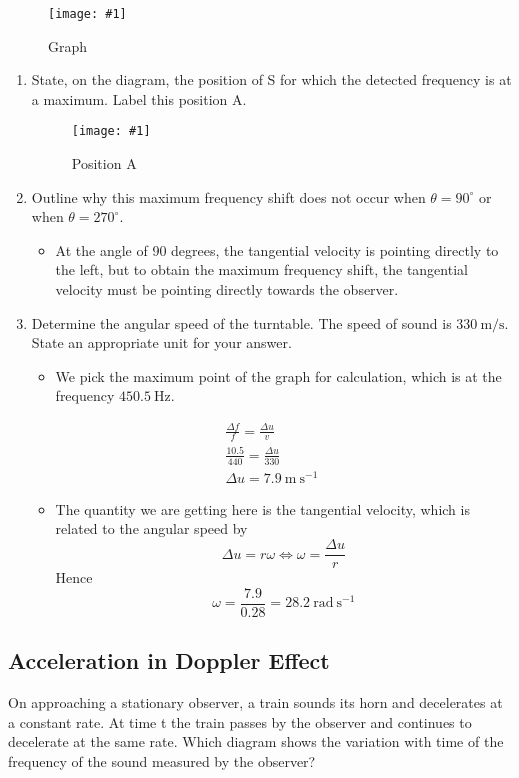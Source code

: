 \documentclass[a4paper,12pt]{article}
\newcommand{\degsym}{^{\circ}}
\newcommand{\img}[4]{\begin{center}
  \begin{figure}[H]
    \centering
    \texttt{[image: \#1]}
    \caption{#3}
    \label{fig:#4}
  \end{figure}
\end{center}}
\begin{document}
\img{ex/2.png}{0.9}{Graph}{2}

\begin{enumerate}[label=(\alph*)]
  \item State, on the diagram, the position of S for which the detected frequency is at a maximum. Label this position A.
        \img{ex/3.png}{0.9}{Position A}{3}
  \item Outline why this maximum frequency shift does not occur when $\theta= 90\degsym$ or when $\theta= 270\degsym$.
        \begin{itemize}
          \item At the angle of 90 degrees, the tangential velocity is pointing directly to the left, but to obtain the maximum frequency shift, the tangential velocity must be pointing directly towards the observer.
        \end{itemize}
  \item Determine the angular speed of the turntable. The speed of sound is $\SI{330}{\m\per\s}$. State an appropriate unit for your answer.
        \begin{itemize}
          \item We pick the maximum point of the graph for calculation, which is at the frequency $450.5 \mathrm{~Hz}$.
        \end{itemize}
        \begin{align*}
          \frac{\Delta f}{f} = \frac{\Delta u}{v} \\
          \frac{10.5}{440} = \frac{\Delta u}{330} \\
          \Delta u = 7.9 \mathrm{~m} \mathrm{~s}^{-1}
        \end{align*}
        \begin{itemize}
          \item The quantity we are getting here is the tangential velocity, which is related to the angular speed by
                $$\Delta u = r\omega \iff \omega = \frac{\Delta u}{r}$$
                Hence
                $$\omega = \frac{7.9}{0.28} = 28.2 \mathrm{~rad} \mathrm{~s}^{-1}$$
        \end{itemize}
\end{enumerate}

\pagebreak

\subsection{Acceleration in Doppler Effect}

On approaching a stationary observer, a train sounds its horn and decelerates at a constant rate. At time t the train passes by the observer and continues to decelerate at the same rate. Which diagram shows the variation with time of the frequency of the sound measured by the observer?
\end{document}
